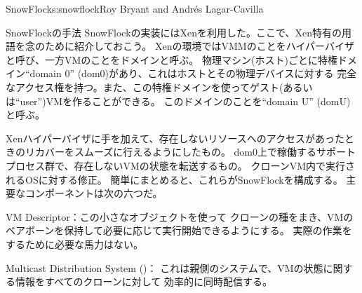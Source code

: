 \begin{aosachapter}{SnowFlock}{s:snowflock}{Roy Bryant and Andr\'e{s} Lagar-Cavilla}
\begin{aosasect1}{SnowFlockの手法}
SnowFlockの実装にはXenを利用した。ここで、Xen特有の用語を念のために紹介しておこう。
Xenの環境ではVMMのことをハイパーバイザと呼び、一方VMのことをドメインと呼ぶ。
物理マシン(ホスト)ごとに特権ドメイン``domain 0'' (dom0)があり、これはホストとその物理デバイスに対する
完全なアクセス権を持つ。また、この特権ドメインを使ってゲスト(あるいは``user'')VMを作ることができる。
このドメインのことを``domain U'' (domU)と呼ぶ。

Xenハイパーバイザに手を加えて、存在しないリソースへのアクセスがあったときのリカバーをスムーズに行えるようにしたもの。
dom0上で稼働するサポートプロセス群で、存在しないVMの状態を転送するもの。
クローンVM内で実行されるOSに対する修正。
簡単にまとめると、これらがSnowFlockを構成する。
主要なコンポーネントは次の六つだ。

\begin{aosaitemize}

  \item VM Descriptor：この小さなオブジェクトを使って
  クローンの種をまき、VMのベアボーンを保持して必要に応じて実行開始できるようにする。
  実際の作業をするために必要な馬力はない。

  \item Multicast Distribution System ()：
  これは親側のシステムで、VMの状態に関する情報をすべてのクローンに対して
  効率的に同時配信する。


\end{aosaitemize}
\end{aosasect1}
\end{aosachapter}
